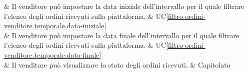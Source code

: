  & Il venditore può impostare la data iniziale dell'intervallo per il quale filtrare l'elenco degli ordini ricevuti sulla piattaforma. & UC\ref{filtro-ordini-venditore.temporale.data-iniziale} \\
    
 & Il venditore può impostare la data finale dell'intervallo per il quale filtrare l'elenco degli ordini ricevuti sulla piattaforma. & UC\ref{filtro-ordini-venditore.temporale.data-finale} \\

 & Il venditore può visualizzare lo stato degli ordini ricevuti. & Capitolato \\ 